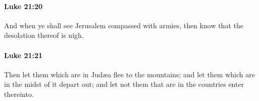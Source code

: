 		\paragraph{Luke 21:20} %
			\label{LUKE-21-20}

			And when ye shall see Jerusalem compassed with armies, then know that the desolation thereof is nigh.

			\begin{framed}
			\scriptsize
				\begin{compactdesc}
					\item[SBLG] 
				\end{compactdesc}
			\end{framed}

		\paragraph{Luke 21:21} %
			\label{LUKE-21-21}

			Then let them which are in Judæa flee to the mountains; and let them which are in the midst of it depart out; and let not them that are in the countries enter thereinto.

